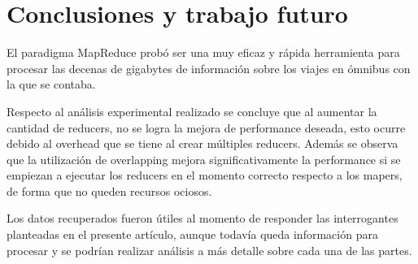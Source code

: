 \documentclass[conference]{IEEEtran}
\begin{document}
\section{Conclusiones y trabajo futuro} 
El paradigma MapReduce probó ser una muy eficaz y rápida herramienta para procesar las decenas de gigabytes de información sobre los viajes en ómnibus con la que se contaba.

Respecto al análisis experimental realizado se concluye que al aumentar la cantidad de reducers, no se logra la mejora de performance deseada, esto ocurre debido al overhead que se tiene al crear múltiples reducers. Además se observa que la utilización de overlapping mejora significativamente la performance si se empiezan a ejecutar los reducers en el momento correcto respecto a los mapers, de forma que no queden recursos ociosos.

Los datos recuperados fueron útiles al momento de responder las interrogantes planteadas en el presente artículo, aunque todavía queda información para procesar y se podrían realizar análisis a más detalle sobre cada una de las partes. 
\end{document}
